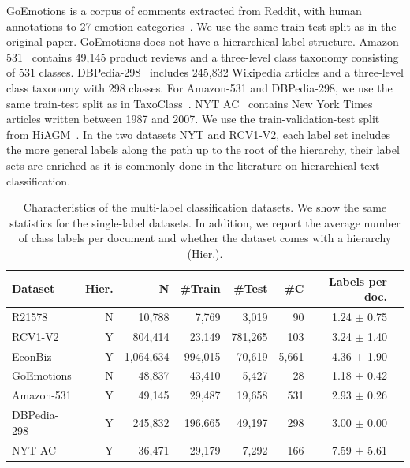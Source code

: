 GoEmotions is a corpus of comments extracted from Reddit, with human annotations to 27 emotion categories~\cite{demszky2020goemotions}. 
We use the same train-test split as in the original paper. 
GoEmotions does not have a hierarchical label structure. Amazon-531~\cite{hiddenfactors} contains
49,145 product reviews and a three-level class taxonomy consisting of 531 classes. 
DBPedia-298~\cite{Lehmann2015DBpediaA} includes 245,832 Wikipedia articles and a three-level class taxonomy with 298 classes. For Amazon-531 and DBPedia-298, we use the same train-test split as in TaxoClass~\cite{shen-etal-2021-taxoclass}.
NYT AC~\cite{sandhaus} contains New York Times articles written between 1987 and 2007. We use the train-validation-test split from HiAGM~\cite{hiagm}.
In the two datasets NYT and RCV1-V2, each label set includes the more general labels along the path up to the root of the hierarchy, \ie their label sets are enriched as it is commonly done in the literature on hierarchical text classification.

\begin{table}[ht]
    \centering
    \caption{Characteristics of the multi-label classification datasets. 
    We show the same statistics for the single-label datasets.
    In addition, we report the average number of class labels per document and whether the dataset comes with a hierarchy (Hier.).
    }
    \label{tab:multilabeldatasets}
    \begin{tabular}{lrrrrrrr}
    \toprule
    \textbf{Dataset} & \textbf{Hier.} & \textbf{N} & \textbf{\#Train} & \textbf{\#Test} & \textbf{\#C}  & \textbf{Labels per doc.} \\    
    \midrule                                                               
    R21578   & N & 10,788  & 7,769  & 3,019 & 90  &  1.24 $\pm$ 0.75   \\ 
    RCV1-V2  & Y   &  804,414  & 23,149   & 781,265 & 103  & 3.24 $\pm$ 1.40  \\ 
    EconBiz  &  Y & 1,064,634  & 994,015  & 70,619 & 5,661  & 4.36 $\pm$ 1.90  \\ 
    GoEmotions  & N  & 48,837  & 43,410  & 5,427 & 28   & 1.18 $\pm$ 0.42   \\ 
    Amazon-531  &  Y   & 49,145  &  29,487  &  19,658  & 531 & 2.93 $\pm$ 0.26  \\  
    DBPedia-298  &  Y   &  245,832  &  196,665  & 49,197 & 298   & 3.00 $\pm$ 0.00\\ 
    NYT AC  & Y   &  36,471  & 29,179    & 7,292 & 166 &  7.59 $\pm$ 5.61  \\   
   \bottomrule
    \end{tabular}
\end{table}

